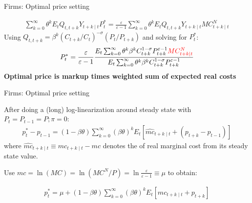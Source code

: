 \documentclass{beamer}
\newcommand{\tb}[1]{{\color{blue}{\textbf{#1}}}}
\begin{document}
\begin{frame}{Firms: Optimal price setting}

\begin{align*}
  \sum_{k=0}^{\infty} \theta^k E_t Q_{t,t+k} Y_{t+k \mid t} P^*_t =\frac{\varepsilon}{\varepsilon-1} \sum_{k=0}^{\infty} \theta^k E_t  Q_{t,t+k} Y_{t+k \mid t}   MC^N_{t+k \mid t}
\end{align*}
Using $Q_{t, t+k} = \beta^k (C_{t+k}/C_t)^{-\sigma} (P_t/P_{t+k})$ and solving for $P^*_t$:
\begin{align*}
  P^*_t = \frac{\varepsilon}{\varepsilon-1} \frac{E_t \sum_{k=0}^\infty  \theta^k \beta^k C^{1-\sigma}_{t+k} P^{\varepsilon-1}_{t+k} \textcolor{red}{MC^N_{t+k\mid t}}}{E_t \sum_{k=0}^\infty  \theta^k \beta^k C^{1-\sigma}_{t+k} P^{\varepsilon-1}_{t+k}}
\end{align*}
\vfill
\textbf{Optimal price is markup times weighted sum of expected real costs}
\end{frame}
\begin{frame}{Firms: Optimal price setting}

  After doing a (long) log-linearization around steady state with $P_t = P_{t-1} = P; \pi=0$:
\begin{align}
p_t^*-p_{t-1}= (1-\beta \theta) \sum_{k=0}^{\infty}(\beta \theta)^k
E_t [\hat{mc}_{t+k \mid t}+(p_{t+k}-p_{t-1})] \label{pstar-pminus1}
 \end{align}
where $\hat{mc}_{t+k \mid t}\equiv mc_{t+k \mid t}-mc$ denotes the \tb{log deviation} of real marginal cost from its steady state value.

Use $mc = \ln(MC) = \ln(MC^N/P) =  \ln \frac{\varepsilon}{\varepsilon-1} \equiv \mu$ to obtain:

\begin{align*}
p_t^* = \mu + (1-\beta \theta) \sum_{k=0}^{\infty}(\beta \theta)^k
 E_t [mc_{t+k \mid t}+p_{t+k}] 
\end{align*}
\end{frame}
\end{document}
